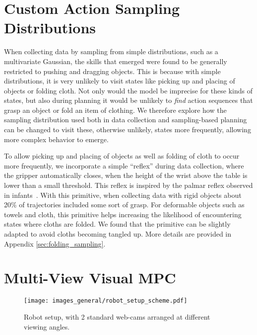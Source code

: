 \section{Custom Action Sampling Distributions}

\label{sec:system}
When collecting data by sampling from simple distributions, such as a multivariate Gaussian, the skills that emerged were found to be generally restricted to pushing and dragging objects. This is because with simple distributions, it is very unlikely to visit states like picking up and placing of objects or folding cloth. Not only would the model be imprecise for these kinds of states, but also during planning it would be unlikely to \emph{find} action sequences that grasp an object or fold an item of clothing.
We therefore explore how the sampling distribution used both in data collection and sampling-based planning can be changed to visit these, otherwise unlikely, states more frequently, allowing more complex behavior to emerge. 

To allow picking up and placing of objects as well as folding of cloth to occur more frequently, we incorporate a simple ``reflex'' during data collection, where the gripper automatically closes, when the height of the wrist above the table is lower than a small threshold. This reflex is inspired by the palmar reflex observed in infants~\cite{grasping_fetal}. With this primitive, when collecting data with rigid objects about 20\% of trajectories included some sort of grasp. For deformable objects such as towels and cloth, this primitive helps increasing the likelihood of encountering states where cloths are folded. We found that the primitive can be slightly adapted to avoid cloths becoming tangled up. More details are provided in Appendix \ref{sec:folding_sampling}.



\section{Multi-View Visual MPC}
\label{sec:multiview}
\begin{wrapfigure}{r}{.45\columnwidth}
	\centering
	\texttt{[image: images\_general/robot\_setup\_scheme.pdf]}
	\caption{\small{Robot setup, with 2 standard web-cams arranged at different viewing angles.}}	\label{fig:robot_setup}
\end{wrapfigure}


